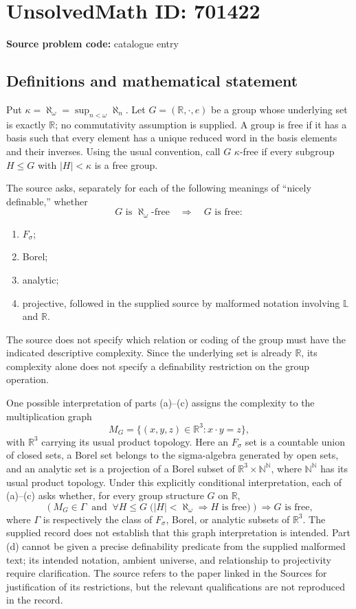 \documentclass[11pt]{article}
\newcommand{\N}{\mathbb{N}}
\newcommand{\R}{\mathbb{R}}
\begin{document}
\section*{UnsolvedMath ID: 701422}
\textbf{Source problem code:} catalogue entry
\subsection{Definitions and mathematical statement}
Put \(\kappa=\aleph_\omega=\sup_{n<\omega}\aleph_n\). Let \(G=(\R,\cdot,e)\) be a group whose underlying set is exactly \(\R\); no commutativity assumption is supplied. A group is free if it has a basis such that every element has a unique reduced word in the basis elements and their inverses. Using the usual convention, call \(G\) \(\kappa\)-free if every subgroup \(H\leq G\) with \(|H|<\kappa\) is a free group.

The source asks, separately for each of the following meanings of ``nicely definable,'' whether
\[
G\text{ is }\aleph_\omega\text{-free}
\quad\Longrightarrow\quad
G\text{ is free}:
\]
\begin{enumerate}
\item[(a)] \(F_\sigma\);
\item[(b)] Borel;
\item[(c)] analytic;
\item[(d)] projective, followed in the supplied source by malformed notation involving \(\mathbb L\) and \(\mathbb R\).
\end{enumerate}
The source does not specify which relation or coding of the group must have the indicated descriptive complexity. Since the underlying set is already \(\R\), its complexity alone does not specify a definability restriction on the group operation.

One possible interpretation of parts (a)--(c) assigns the complexity to the multiplication graph
\[
M_G=\{(x,y,z)\in\R^3:x\cdot y=z\},
\]
with \(\R^3\) carrying its usual product topology. Here an \(F_\sigma\) set is a countable union of closed sets, a Borel set belongs to the sigma-algebra generated by open sets, and an analytic set is a projection of a Borel subset of \(\R^3\times\N^{\N}\), where \(\N^{\N}\) has its usual product topology. Under this explicitly conditional interpretation, each of (a)--(c) asks whether, for every group structure \(G\) on \(\R\),
\[
\left(M_G\in\Gamma\ \text{ and }\
\forall H\leq G\;\bigl(|H|<\aleph_\omega\Longrightarrow H\text{ is free}\bigr)\right)
\Longrightarrow G\text{ is free},
\]
where \(\Gamma\) is respectively the class of \(F_\sigma\), Borel, or analytic subsets of \(\R^3\). The supplied record does not establish that this graph interpretation is intended. Part (d) cannot be given a precise definability predicate from the supplied malformed text; its intended notation, ambient universe, and relationship to projectivity require clarification. The source refers to the paper linked in the Sources for justification of its restrictions, but the relevant qualifications are not reproduced in the record.
\end{document}
